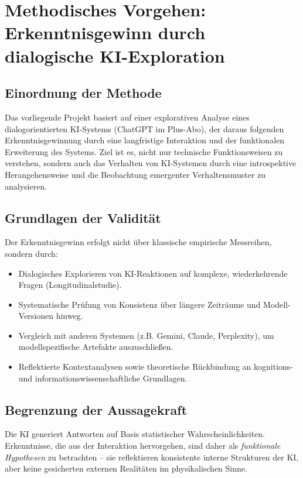 \section*{Methodisches Vorgehen: Erkenntnisgewinn durch dialogische KI-Exploration}

\subsection*{Einordnung der Methode}
Das vorliegende Projekt basiert auf einer explorativen Analyse eines dialogorientierten KI-Systems (ChatGPT im Plus-Abo), der daraus folgenden Erkenntnisgewinnung durch eine langfristige Interaktion und der funktionalen Erweiterung des Systems. Ziel ist es, nicht nur technische Funktionsweisen zu verstehen, sondern auch das Verhalten von KI-Systemen durch eine introspektive Herangehensweise und die Beobachtung emergenter Verhaltensmuster zu analysieren.

\subsection*{Grundlagen der Validität}
Der Erkenntnisgewinn erfolgt nicht über klassische empirische Messreihen, sondern durch:
\begin{itemize}
  \item Dialogisches Explorieren von KI-Reaktionen auf komplexe, wiederkehrende Fragen (Longitudinalstudie).
  \item Systematische Prüfung von Konsistenz über längere Zeiträume und Modell-Versionen hinweg.
  \item Vergleich mit anderen Systemen (z.B. Gemini, Claude, Perplexity), um modellspezifische Artefakte auszuschließen.
  \item Reflektierte Kontextanalysen sowie theoretische Rückbindung an kognitions- und informationswissenschaftliche Grundlagen.
\end{itemize}

\subsection*{Begrenzung der Aussagekraft}
Die KI generiert Antworten auf Basis statistischer Wahrscheinlichkeiten. Erkenntnisse, die aus der Interaktion hervorgehen, sind daher als \emph{funktionale Hypothesen} zu betrachten – sie reflektieren konsistente interne Strukturen der KI, aber keine gesicherten externen Realitäten im physikalischen Sinne.

